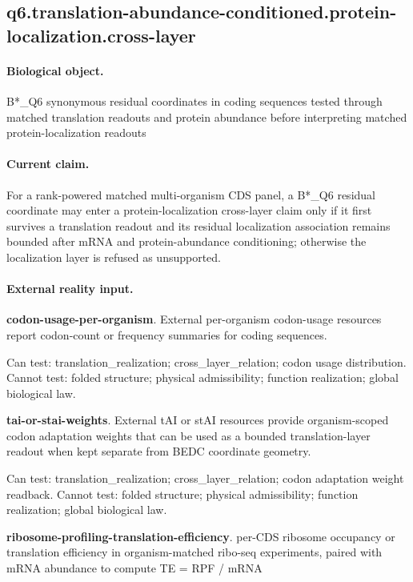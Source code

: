 \subsection{q6.translation-abundance-conditioned.protein-localization.cross-layer}

\paragraph{Biological object.} B*\_Q6 synonymous residual coordinates in coding sequences tested through matched translation readouts and protein abundance before interpreting matched protein-localization readouts

\paragraph{Current claim.} For a rank-powered matched multi-organism CDS panel, a B*\_Q6 residual coordinate may enter a protein-localization cross-layer claim only if it first survives a translation readout and its residual localization association remains bounded after mRNA and protein-abundance conditioning; otherwise the localization layer is refused as unsupported.

\paragraph{External reality input.}
\textbf{codon-usage-per-organism}. External per-organism codon-usage resources report codon-count or frequency summaries for coding sequences.

Can test: translation\_realization; cross\_layer\_relation; codon usage distribution. Cannot test: folded structure; physical admissibility; function realization; global biological law.

\textbf{tai-or-stai-weights}. External tAI or stAI resources provide organism-scoped codon adaptation weights that can be used as a bounded translation-layer readout when kept separate from BEDC coordinate geometry.

Can test: translation\_realization; cross\_layer\_relation; codon adaptation weight readback. Cannot test: folded structure; physical admissibility; function realization; global biological law.

\textbf{ribosome-profiling-translation-efficiency}. per-CDS ribosome occupancy or translation efficiency in organism-matched ribo-seq experiments, paired with mRNA abundance to compute TE = RPF / mRNA

